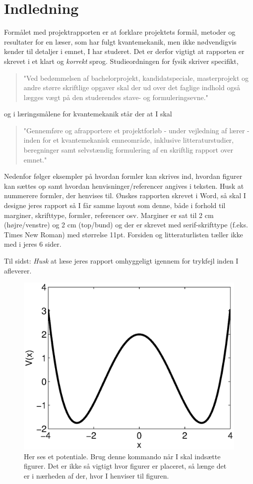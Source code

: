 \documentclass[danish,a4paper,oneside,onecolumn,article,11pt]{memoir}
\begin{document}
\chapter{Indledning}
Formålet med projektrapporten er at forklare projektets formål,
metoder og resultater for en læser, som har fulgt kvantemekanik, men
ikke nødvendigvis kender til detaljer i emnet, I har studeret. Det er
derfor vigtigt at rapporten er skrevet i et klart og \emph{korrekt}
sprog. Studieordningen for fysik skriver specifikt,

\begin{quote}
  "Ved bedømmelsen af bachelorprojekt, kandidatspeciale, masterprojekt
  og andre større skriftlige opgaver skal der ud over det faglige
  indhold også lægges vægt på den studerendes stave- og
  formuleringsevne."  
\end{quote}
og i læringsmålene for kvantemekanik står der at I skal
\begin{quote}
  "Gennemføre og afrapportere et projektforløb - under vejledning af
  lærer - inden for et kvantemekanisk emneområde, inklusive
  litteraturstudier, beregninger samt selvstændig formulering af en
  skriftlig rapport over emnet."  
\end{quote}


Nedenfor følger eksempler på hvordan formler kan skrives ind, hvordan
figurer kan sættes op samt hvordan henvisninger/referencer angives i
teksten. Husk at nummerere formler, der henvises til.  Ønskes
rapporten skrevet i Word, så skal I designe jeres rapport så I får
samme layout som denne, både i forhold til marginer, skrifttype,
formler, referencer osv. Marginer er sat til 2 cm (højre/venstre) og 2
cm (top/bund) og der er skrevet med serif-skrifttype (f.eks. Times New
Roman) med størrelse 11pt. Forsiden og litteraturlisten tæller ikke
med i jeres 6 sider.

Til sidst: \emph{Husk} at læse jeres rapport omhyggeligt igennem for
trykfejl inden I afleverer.

\begin{figure}
\begin{center}
\includegraphics[width=0.5\columnwidth]{potential.eps}
\caption{Her ses et potentiale. Brug denne kommando når I skal
  indsætte figurer. Det er ikke så vigtigt hvor figurer er placeret,
  så længe det er i nærheden af der, hvor I henviser til figuren.}
\label{fig:pot}
\end{center}
\end{figure}
\end{document}
